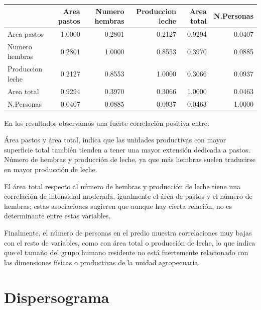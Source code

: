 \documentclass[]{tufte-handout}
\begin{document}
\begin{tabular}{lrrrrr}
\toprule
  & Area pastos & Numero hembras & Produccion leche & Area total & N.Personas\\
\midrule
Area pastos & 1.0000 & 0.2801 & 0.2127 & 0.9294 & 0.0407\\
Numero hembras & 0.2801 & 1.0000 & 0.8553 & 0.3970 & 0.0885\\
Produccion leche & 0.2127 & 0.8553 & 1.0000 & 0.3066 & 0.0937\\
Area total & 0.9294 & 0.3970 & 0.3066 & 1.0000 & 0.0463\\
N.Personas & 0.0407 & 0.0885 & 0.0937 & 0.0463 & 1.0000\\
\bottomrule
\end{tabular}
\begin{justify}
En los resultados observamos una fuerte correlación positiva entre:

Área pastos y área total, indica que las unidades productivas con mayor superficie total también tienden a tener una mayor extensión dedicada a pastos. Número de hembras y producción de leche, ya que más hembras suelen traducirse en mayor producción de leche.

El área total respecto al número de hembras y producción de leche tiene una correlación de intensidad moderada, igualmente el área de pastos y el número de hembras; estas asociaciones sugieren que aunque hay cierta relación, no es determinante entre estas variables.

Finalmente, el número de personas en el predio muestra correlaciones muy bajas con el resto de variables, como con área total o producción de leche, lo que indica que el tamaño del grupo humano residente no está fuertemente relacionado con las dimensiones físicas o productivas de la unidad agropecuaria.

\end{justify}

\section{Dispersograma}\label{dispersograma}
\end{document}

